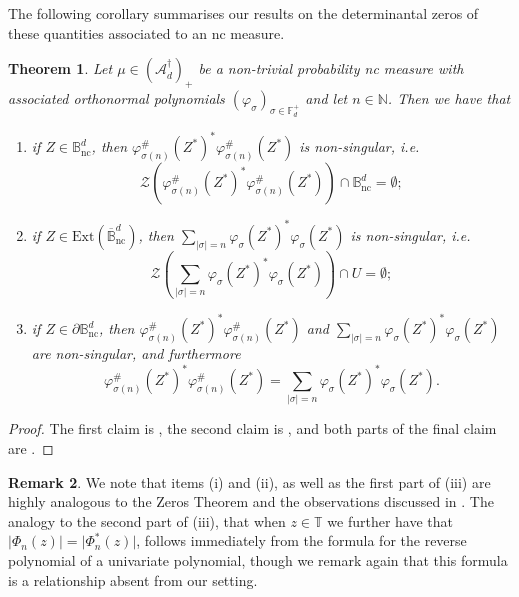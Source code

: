 \documentclass[11pt,reqno]{amsart}
\newcommand\ncm[1]{(\mathscr{A}_{#1}^{\dagger})_+}
\def\p{\varphi}
\def\s{\sigma}
\def\P{\Phi}
\def\NN{\mathbb{N}}
\def\BB{\mathbb{B}}
\def\TT{\mathbb{T}}
\def\FF{\mathbb{F}}
\def\nc{\mathrm{nc}}
\def\cZ{\mathcal{Z}}
\newtheorem{theorem}{Theorem}[section]
\theoremstyle{definition}
\newtheorem{remark}[theorem]{Remark}
\numberwithin{equation}{section}
\begin{document}
The following corollary summarises our results on the determinantal zeros of these quantities associated to an nc measure.

\begin{theorem}
    \label{thm:NCZerosThm}
    Let \(\mu \in \ncm{d}\) be a non-trivial probability nc measure with associated orthonormal polynomials \((\p_\s)_{\s \in \FF_d^+}\) and let \(n \in \NN\). Then we have that
    \begin{enumerate}
        \item[\rm{(i)}] if \(Z \in \BB_\nc^d\), then \(\p_{\s(n)}^\#(Z^*)^* \p_{\s(n)}^\#(Z^*)\) is non-singular, i.e.
        \[
            \cZ\left(\p_{\s(n)}^\#(Z^*)^* \p_{\s(n)}^\#(Z^*)\right) \cap \BB_\nc^d = \emptyset;
        \]
        \item[\rm{(ii)}] if \(Z \in \mathrm{Ext}(\overline{\BB}^d_{\nc})\), then \(\sum_{\lvert \s \rvert = n} \p_\s(Z^*)^* \p_\s(Z^*) \) is non-singular, i.e. 
        \[
            \cZ\left(\sum_{\lvert \s \rvert = n} \p_\s(Z^*)^* \p_\s(Z^*)\right) \cap U = \emptyset;
        \]
        \item[\rm{(iii)}] if \(Z \in \partial \BB_{\nc}^d\), then \(\p_{\s(n)}^\#(Z^*)^* \p_{\s(n)}^\#(Z^*)\) and \(\sum_{\lvert \s \rvert = n} \p_\s(Z^*)^* \p_\s(Z^*)\) are non-singular, and furthermore
        \[
            \p_{\s(n)}^\#(Z^*)^* \p_{\s(n)}^\#(Z^*) = \sum_{\lvert \s \rvert = n} \p_\s(Z^*)^* \p_\s(Z^*).
        \]
    \end{enumerate}
\end{theorem}

\begin{proof}
    The first claim is , the second claim is , and both parts of the final claim are .
\end{proof}

\begin{remark}
    We note that items (i) and (ii), as well as the first part of (iii) are highly analogous to the Zeros Theorem \cite[Theorem 1.7.1]{Sim05} and the observations discussed in . The analogy to the second part of (iii), that when \(z \in \TT\) we further have that \(\lvert \P_n(z) \rvert = \lvert \P_n^*(z) \rvert\), follows immediately from the formula for the reverse polynomial of a univariate polynomial, though we remark again that this formula is a relationship absent from our setting.
\end{remark}



\end{document}
